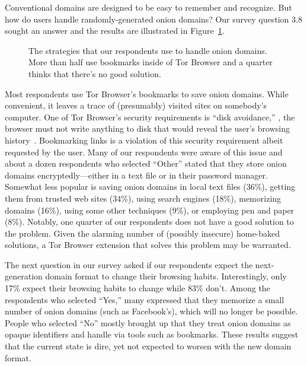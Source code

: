 Conventional domains are designed to be easy to remember and recognize.  But how
do users handle randomly-generated onion domains?  Our survey question 3.8
sought an answer and the results are illustrated in
Figure~\ref{fig:onion-domain-mgmt}.

\begin{figure}[t]
    \centering
    
    \caption{The strategies that our respondents use to handle onion domains.
    More than half use bookmarks inside of Tor Browser and a quarter thinks that
    there's no good solution.}
    \label{fig:onion-domain-mgmt}
\end{figure}

Most respondents use Tor Browser's bookmarks to save onion domains.  While
convenient, it leaves a trace of (presumably) visited sites on somebody's
computer.  One of Tor Browser's security requirements is ``disk avoidance,''
\ie, the browser must not write anything to disk that would reveal the user's
browsing history~\cite[\S~2.1]{Perry2017a}.  Bookmarking links is a violation of
this security requirement albeit requested by the user.  Many of our respondents
were aware of this issue and about a dozen respondents who selected ``Other''
stated that they store onion domains encryptedly---either in a text file or in
their password manager.  Somewhat less popular is saving onion domains in local
text files (36\%), getting them from trusted web sites (34\%), using search
engines (18\%), memorizing domains (16\%), using some other techniques (9\%), or
employing pen and paper (8\%).  Notably, one quarter of our respondents does not
have a good solution to the problem.  Given the alarming number of (possibly
insecure) home-baked solutions, a Tor Browser extension that solves this problem
may be warranted.

The next question in our survey asked if our respondents expect the
next-generation domain format to change their browsing habits.  Interestingly,
only 17\% expect their browsing habits to change while 83\% don't.  Among the
respondents who selected ``Yes,'' many expressed that they memorize a small
number of onion domains (such as Facebook's), which will no longer be possible.
People who selected ``No'' mostly brought up that they treat onion domains as
opaque identifiers and handle via tools such as bookmarks.  These results
suggest that the current state is dire, yet not expected to worsen with the new
domain format.

% 


